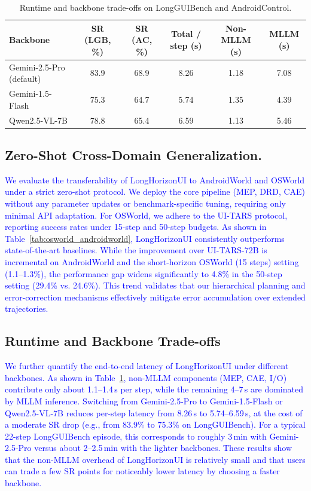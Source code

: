 \documentclass{article} %
\newcommand{\revise}[1]{\textcolor{blue}{#1}}
\begin{document}
 \begin{table}[t]
    \centering
    \small
    \caption{Runtime and backbone trade-offs on LongGUIBench and AndroidControl.}
    \label{tab:runtime_backbone}
    \setlength{\tabcolsep}{6pt}
    \begin{tabular}{lccccc}
        \toprule
        \textbf{Backbone} & \textbf{SR (LGB, \%)} & \textbf{SR (AC, \%)} & \textbf{Total / step (s)} & \textbf{Non-MLLM (s)} & \textbf{MLLM (s)} \\
        \midrule
        Gemini-2.5-Pro (default) & 83.9 & 68.9 & 8.26 & 1.18 & 7.08 \\
        Gemini-1.5-Flash        & 75.3 & 64.7 & 5.74 & 1.35 & 4.39 \\
        Qwen2.5-VL-7B           & 78.8 & 65.4 & 6.59 & 1.13 & 5.46 \\
        \bottomrule
    \end{tabular}
\end{table}

\subsection{Zero-Shot Cross-Domain Generalization.}
\label{sec:Rollback}
 \revise{We evaluate the transferability of LongHorizonUI to AndroidWorld and OSWorld under a strict zero-shot protocol. We deploy the core pipeline (MEP, DRD, CAE) without any parameter updates or benchmark-specific tuning, requiring only minimal API adaptation. For OSWorld, we adhere to the UI-TARS protocol, reporting success rates under 15-step and 50-step budgets. As shown in Table~\ref{tab:osworld_androidworld}, LongHorizonUI consistently outperforms state-of-the-art baselines. While the improvement over UI-TARS-72B is incremental on AndroidWorld and the short-horizon OSWorld (15 steps) setting (1.1--1.3\%), the performance gap widens significantly to 4.8\% in the 50-step setting (29.4\% vs. 24.6\%). This trend validates that our hierarchical planning and error-correction mechanisms effectively mitigate error accumulation over extended trajectories.}




\subsection{Runtime and Backbone Trade-offs}
\label{sec:runtime_backbone}
\revise{We further quantify the end-to-end latency of LongHorizonUI under different backbones. As shown in Table~\ref{tab:runtime_backbone}, non-MLLM components (MEP, CAE, I/O) contribute only about 1.1--1.4\,s per step, while the remaining 4--7\,s are dominated by MLLM inference. Switching from Gemini-2.5-Pro to Gemini-1.5-Flash or Qwen2.5-VL-7B reduces per-step latency from 8.26\,s to 5.74--6.59\,s, at the cost of a moderate SR drop (e.g., from 83.9\% to 75.3\% on LongGUIBench). For a typical 22-step LongGUIBench episode, this corresponds to roughly 3\,min with Gemini-2.5-Pro versus about 2--2.5\,min with the lighter backbones. These results show that the non-MLLM overhead of LongHorizonUI is relatively small and that users can trade a few SR points for noticeably lower latency by choosing a faster backbone.}
\end{document}
